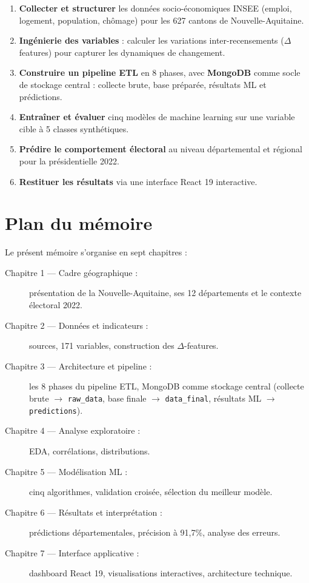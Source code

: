 \begin{enumerate}
  \item \textbf{Collecter et structurer} les données socio-économiques INSEE (emploi,
        logement, population, chômage) pour les 627 cantons de Nouvelle-Aquitaine.
  \item \textbf{Ingénierie des variables} : calculer les variations inter-recensements
        ($\Delta$ features) pour capturer les dynamiques de changement.
  \item \textbf{Construire un pipeline ETL} en 8 phases, avec \textbf{MongoDB} comme socle de stockage central : collecte brute, base préparée, résultats ML et prédictions.
  \item \textbf{Entraîner et évaluer} cinq modèles de machine learning sur une variable
        cible à 5 classes synthétiques.
  \item \textbf{Prédire le comportement électoral} au niveau départemental et régional
        pour la présidentielle 2022.
  \item \textbf{Restituer les résultats} via une interface React 19 interactive.
\end{enumerate}

\section*{Plan du mémoire}

Le présent mémoire s'organise en sept chapitres :

\begin{description}
  \item[Chapitre 1 — Cadre géographique :] présentation de la Nouvelle-Aquitaine,
    ses 12 départements et le contexte électoral 2022.
  \item[Chapitre 2 — Données et indicateurs :] sources, 171 variables,
    construction des $\Delta$-features.
  \item[Chapitre 3 — Architecture et pipeline :] les 8 phases du pipeline ETL,
    MongoDB comme stockage central (collecte brute $\rightarrow$ \texttt{raw\_data},
    base finale $\rightarrow$ \texttt{data\_final}, résultats ML $\rightarrow$ \texttt{predictions}).
  \item[Chapitre 4 — Analyse exploratoire :] EDA, corrélations, distributions.
  \item[Chapitre 5 — Modélisation ML :] cinq algorithmes, validation croisée,
    sélection du meilleur modèle.
  \item[Chapitre 6 — Résultats et interprétation :] prédictions départementales,
    précision à 91,7\%, analyse des erreurs.
  \item[Chapitre 7 — Interface applicative :] dashboard React 19, visualisations
    interactives, architecture technique.
\end{description}
